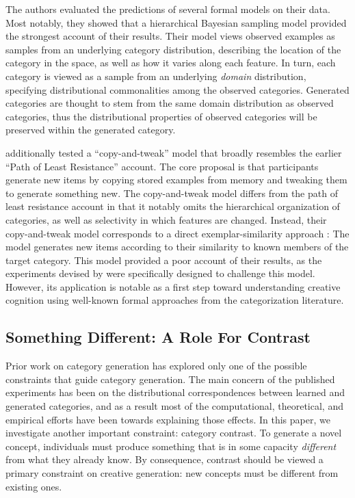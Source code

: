 \documentclass[12pt]{article}
\begin{document}
\begin{flushleft}
The authors evaluated the predictions of several formal models on their data. Most notably, they showed that a hierarchical Bayesian sampling model provided the strongest account of their results. Their model views observed examples as samples from an underlying category distribution, describing the location of the category in the space, as well as how it varies along each feature. In turn, each category is viewed as a sample from an underlying {\em domain} distribution, specifying distributional commonalities among the observed categories. Generated categories are thought to stem from the same domain distribution as observed categories, thus the distributional properties of observed categories will be preserved within the generated category.

\cite{jern2013probabilistic} additionally tested a ``copy-and-tweak'' model that broadly resembles the earlier ``Path of Least Resistance'' account. The core proposal is that participants generate new items by copying stored examples from memory and tweaking them to generate something new. The copy-and-tweak model differs from the path of least resistance account in that it notably omits the hierarchical organization of categories, as well as selectivity in which features are changed. Instead, their copy-and-tweak model corresponds to a direct exemplar-similarity approach \citep[e.g.,][]{nosofsky1984choice,nosofsky1986attention}: The model generates new items according to their similarity to known members of the target category. This model provided a poor account of their results, as the experiments devised by \citeauthor{jern2013probabilistic} were specifically designed to challenge this model. However, its application is notable as a first step toward understanding creative cognition using well-known formal approaches from the categorization literature.


\subsection{Something Different: A Role For Contrast}

Prior work on category generation has explored only one of the possible constraints that guide category generation. The main concern of the published experiments has been on the distributional correspondences between learned and generated categories, and as a result most of the computational, theoretical, and empirical efforts have been towards explaining those effects. In this paper, we investigate another important constraint: category contrast. To generate a novel concept, individuals must produce something that is in some capacity {\em different} from what they already know. By consequence, contrast should be viewed a primary constraint on creative generation: new concepts must be different from existing ones. 


\end{flushleft}
\end{document}
